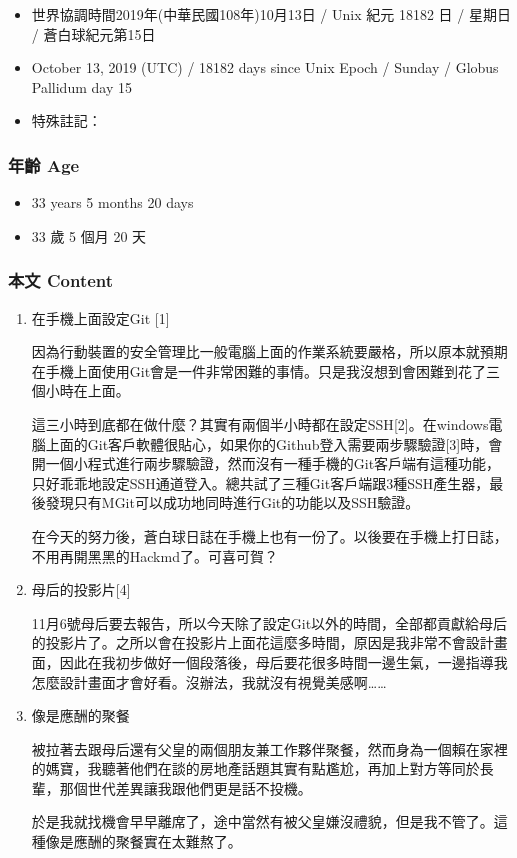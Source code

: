 \documentclass[a5paper, 12pt
]{book}
\providecommand{\tightlist}{%
  \setlength{\itemsep}{0pt}\setlength{\parskip}{0pt}}
\begin{document}
\begin{itemize}
\tightlist
\item
  世界協調時間2019年(中華民國108年)10月13日 / Unix 紀元 18182 日 /
  星期日 / 蒼白球紀元第15日
\item
  October 13, 2019 (UTC) / 18182 days since Unix Epoch / Sunday / Globus
  Pallidum day 15
\item
  特殊註記：
\end{itemize}

\hypertarget{ux5e74ux9f61-age-12}{%
\subsubsection{年齡 Age}\label{ux5e74ux9f61-age-12}}

\begin{itemize}
\tightlist
\item
  33 years 5 months 20 days
\item
  33 歲 5 個月 20 天
\end{itemize}

\hypertarget{ux672cux6587-content-12}{%
\subsubsection{本文 Content}\label{ux672cux6587-content-12}}

\begin{enumerate}
\def\labelenumi{\arabic{enumi}.}
\item
  在手機上面設定Git {[}1{]}

  因為行動裝置的安全管理比一般電腦上面的作業系統要嚴格，所以原本就預期在手機上面使用Git會是一件非常困難的事情。只是我沒想到會困難到花了三個小時在上面。

  這三小時到底都在做什麼？其實有兩個半小時都在設定SSH{[}2{]}。在windows電腦上面的Git客戶軟體很貼心，如果你的Github登入需要兩步驟驗證{[}3{]}時，會開一個小程式進行兩步驟驗證，然而沒有一種手機的Git客戶端有這種功能，只好乖乖地設定SSH通道登入。總共試了三種Git客戶端跟3種SSH產生器，最後發現只有MGit可以成功地同時進行Git的功能以及SSH驗證。

  在今天的努力後，蒼白球日誌在手機上也有一份了。以後要在手機上打日誌，不用再開黑黑的Hackmd了。可喜可賀？
\item
  母后的投影片{[}4{]}

  11月6號母后要去報告，所以今天除了設定Git以外的時間，全部都貢獻給母后的投影片了。之所以會在投影片上面花這麼多時間，原因是我非常不會設計畫面，因此在我初步做好一個段落後，母后要花很多時間一邊生氣，一邊指導我怎麼設計畫面才會好看。沒辦法，我就沒有視覺美感啊\ldots\ldots{}
\item
  像是應酬的聚餐

  被拉著去跟母后還有父皇的兩個朋友兼工作夥伴聚餐，然而身為一個賴在家裡的媽寶，我聽著他們在談的房地產話題其實有點尷尬，再加上對方等同於長輩，那個世代差異讓我跟他們更是話不投機。

  於是我就找機會早早離席了，途中當然有被父皇嫌沒禮貌，但是我不管了。這種像是應酬的聚餐實在太難熬了。
\end{enumerate}
\end{document}
